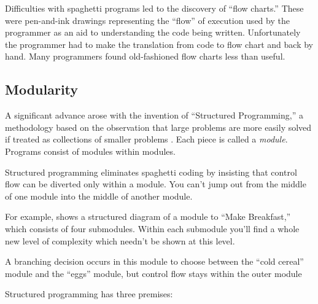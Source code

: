 Difficulties with spaghetti programs
led to the discovery of ``flow charts.''
These were pen-and-ink drawings representing the ``flow'' of execution
used by the programmer as an aid to understanding the code being
written. Unfortunately the programmer had to make the translation from
code to flow chart and back by hand. Many programmers found
old-fashioned flow charts less than useful.

\subsection{Modularity}
A significant advance arose with the invention of ``Structured
Programming,'' a methodology based on the observation that large problems
are more easily solved if treated as collections of smaller problems
\cite{dahl72}. Each piece is called a \emph{module}.
Programs consist of modules within modules.

Structured programming eliminates spaghetti coding by insisting that
control flow can be diverted only within a
module.  You can't jump out from the middle of one module into the
middle of another module.

For example,  shows a structured diagram of a module to
``Make Breakfast,'' which consists of four submodules. Within each
submodule you'll find a whole new level of complexity which needn't be
shown at this level.


A branching decision occurs in this module to choose between the
``cold cereal'' module and the ``eggs'' module, but control flow stays
within the outer module

Structured programming has three premises:

